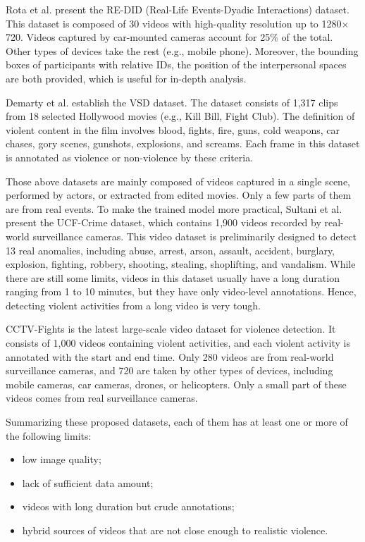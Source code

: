 \documentclass[a4paper,conference]{IEEEtran}
\begin{document}
Rota et al. \cite{redid} present the RE-DID (Real-Life Events-Dyadic Interactions) dataset. This dataset is composed of 30 videos with high-quality resolution up to 1280$\times$720.  Videos captured by car-mounted cameras account for 25\% of the total. Other types of devices take the rest (e.g., mobile phone). Moreover, the bounding boxes of participants with relative IDs, the position of the interpersonal spaces are both provided, which is useful for in-depth analysis.

Demarty et al. \cite{vsd} establish the VSD dataset. The dataset consists of 1,317 clips from 18 selected Hollywood movies (e.g., Kill Bill, Fight Club). The definition of violent content in the film involves blood, fights, fire, guns, cold weapons, car chases, gory scenes, gunshots, explosions, and screams. Each frame in this dataset is annotated as violence or non-violence by these criteria.

Those above datasets are mainly composed of videos captured in a single scene, performed by actors, or extracted from edited movies. Only a few parts of them are from real events. To make the trained model more practical, Sultani et al. \cite{ucf-crime} present the UCF-Crime dataset, which contains 1,900 videos recorded by real-world surveillance cameras. This video dataset is preliminarily designed to detect 13 real anomalies, including abuse, arrest, arson, assault, accident, burglary, explosion, fighting, robbery, shooting, stealing, shoplifting, and vandalism. While there are still some limits, videos in this dataset usually have a long duration ranging from 1 to 10 minutes, but they have only video-level annotations. Hence, detecting violent activities from a long video is very tough.

CCTV-Fights \cite{cctv_fight} is the latest large-scale video dataset for violence detection. It consists of 1,000 videos containing violent activities, and each violent activity is annotated with the start and end time. Only 280 videos are from real-world surveillance cameras, and 720 are taken by other types of devices, including mobile cameras, car cameras, drones, or helicopters. Only a small part of these videos comes from real surveillance cameras.

Summarizing these proposed datasets, each of them has at least one or more of the following limits:
\begin{itemize}
  \item low image quality;
  \item lack of sufficient data amount;
  \item videos with long duration but crude annotations;
  \item hybrid sources of videos that are not close enough to realistic violence.
\end{itemize}
\end{document}

